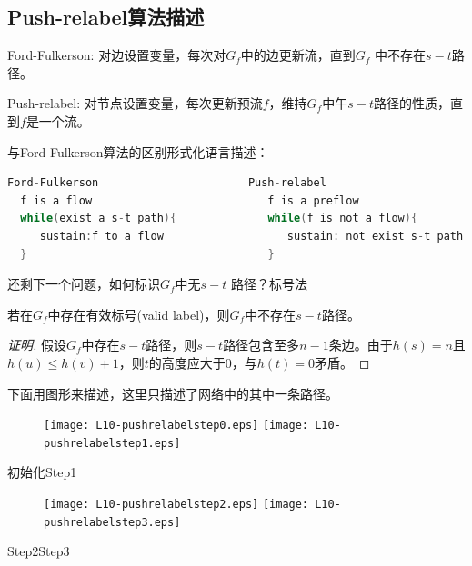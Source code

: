   \subsection{Push-relabel算法描述}
\begin{itemize}
  \begin{small}
 \item  Ford-Fulkerson: 对边设置变量，每次对$G_f$中的边更新流，直到$G_f$ 中不存在$s-t$路径。
 \item  Push-relabel: 对节点设置变量，每次更新预流$f$，维持$G_f$中午$s-t$路径的性质，直到$f$是一个流。
\end{small}
\end{itemize}
与Ford-Fulkerson算法的区别形式化语言描述：
\begin{lstlisting}[language=c]
  Ford-Fulkerson                       Push-relabel
  f is a flow                           f is a preflow
  while(exist a s-t path){              while(f is not a flow){
     sustain:f to a flow                   sustain: not exist s-t path
  }                                     }
\end{lstlisting}

  还剩下一个问题，如何标识$G_f$中无$s-t$ 路径？标号法

\begin{theorem}
  若在$G_f$中存在有效标号(valid label)，则$G_f$中不存在$s-t$路径。
\end{theorem}
\begin{proof}[证明]
  假设$G_f$中存在$s-t$路径，则$s-t$路径包含至多$n-1$条边。由于$h(s)=n$且$h(u)\leq h(v)+1$，则$t$的高度应大于0，与$h(t)=0$矛盾。
\end{proof}
下面用图形来描述，这里只描述了网络中的其中一条路径。

\begin{figure}[H]
  \center
  \texttt{[image: L10-pushrelabelstep0.eps]}
  \texttt{[image: L10-pushrelabelstep1.eps]}
\end{figure}
\hspace{2cm}初始化\hspace{7cm}Step1
\begin{figure}[H]
  \center
  \texttt{[image: L10-pushrelabelstep2.eps]}
  \texttt{[image: L10-pushrelabelstep3.eps]}
\end{figure}
\hspace{3cm}Step2\hspace{7cm}Step3

